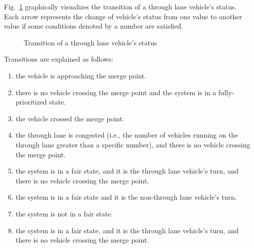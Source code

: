 \documentclass[10pt, conference, compsocconf]{IEEEtran}
\begin{document}
Fig.~\ref{throughLaneStatus} graphically visualizes the transition of a through lane vehicle's status.
Each arrow represents the change of vehicle's status from one value to another value if some conditions denoted by a number are satisfied.

\begin{figure}[h]
\begin{center}
\end{center}
\caption{Transition of a through lane vehicle's status}
\label{throughLaneStatus}
\end{figure}

Transitions are explained as follows:
\begin{enumerate}[]
    \item the vehicle is approaching the merge point. %
    \item there is no vehicle crossing the merge point and the system is in a fully-prioritized state. %
    \item the vehicle crossed the merge point. %
    \item the through lane is congested (i.e., the number of vehicles running on the through lane greater than a specific number), and there is no vehicle crossing the merge point.  %
    \item the system is in a fair state, and it is the through lane vehicle's turn, and there is no vehicle crossing the merge point. %
    \item the  system is in a fair state and it is the non-through lane vehicle's turn. %
    \item the  system is not in a fair state. %
    \item the system is in a fair state, and it is the through lane vehicle's turn, and there is no vehicle crossing the merge point. %
\end{enumerate}
\end{document}
